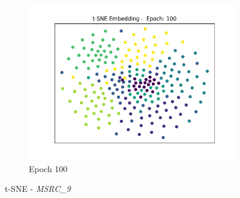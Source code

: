 \begin{figure}[!ht]
\begin{subfigure}{0.3\textwidth}
				\centering
				\includegraphics[width=1.1\linewidth]{images/plotE6_tSNE_e100_MSRC_9_E_GDL_22_00h-05mExp3pull}
				\caption{Epoch 100}
				\label{fig:plote6tsnee100msrc9egdl2200h-05mexp3pull}
			\end{subfigure}
			\caption{t-SNE - \textit{MSRC\_9}}
			\label{fig:E6tSNE1}
		\end{figure}
		
